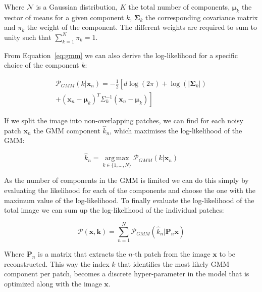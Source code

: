 \documentclass[twocolumn]{aastex631}
\DeclareMathOperator*{\argmax}{arg\,max}
\begin{document}
    Where $\mathcal{N}$ is a Gaussian distribution, $K$ the total number of components, $\boldsymbol{\mu}_k$ the vector of means for a given component $k$, $\boldsymbol{\Sigma}_k$ the corresponding covariance matrix
    and $\pi_k$ the weight of the component. The different weights are required to sum to unity such that $\sum_{k=1}^N\pi_k = 1$. 

    From Equation~\ref{eq:gmm} we can also derive the log-likelihood for a specific choice of the component $k$:
        
    \begin{equation}
    \begin{split}
    \mathcal{P}_{GMM}(k| \mathbf{x}_n) = -\frac{1}{2} \left[ \right. d \log(2\pi)
    + \log(|\boldsymbol \Sigma_{k}|)\\
    + (\mathbf{x}_n - \boldsymbol{\mu}_{k})^T \Sigma^{-1}_{k}(\mathbf{x}_n - \boldsymbol{\mu}_{k}) \left. \right]
    \end{split}
    \end{equation}

    If we split the image into non-overlapping patches, we can find for each noisy patch $\mathbf{x}_n$ the GMM component $\hat{k}_n$, which maximises the log-likelihood of the GMM:
        
    \begin{equation}
        \hat{k}_n = \underset{k \in \{1, ..., N\} }{\argmax}{\mathcal{P}_{GMM}(k| \mathbf{x}_n)}
    \end{equation}
    \vspace{0.2em}

    As the number of components in the GMM is limited we can do this simply by evaluating the likelihood for each of the components and choose the one with
    the maximum value of the log-likelihood. To finally evaluate the log-likelihood
    of the total image we can sum up the log-likelihood of the individual patches: 

    \begin{equation}
        \mathcal{P}(\mathbf{x}, \mathbf{k}) = \sum_{n = 1}^N \mathcal{P}_{GMM}(\hat{k}_n | \mathbf{P}_n \mathbf{x})
    \end{equation}

    Where $\mathbf{P}_n$ is a matrix that extracts the $n$-th patch
    from the image $\mathbf{x}$ to be reconstructed. This way the index $k$ that identifies the most likely GMM component per patch, becomes a discrete hyper-parameter in the model that is optimized along with the image $\mathbf{x}$.
    
\end{document}
